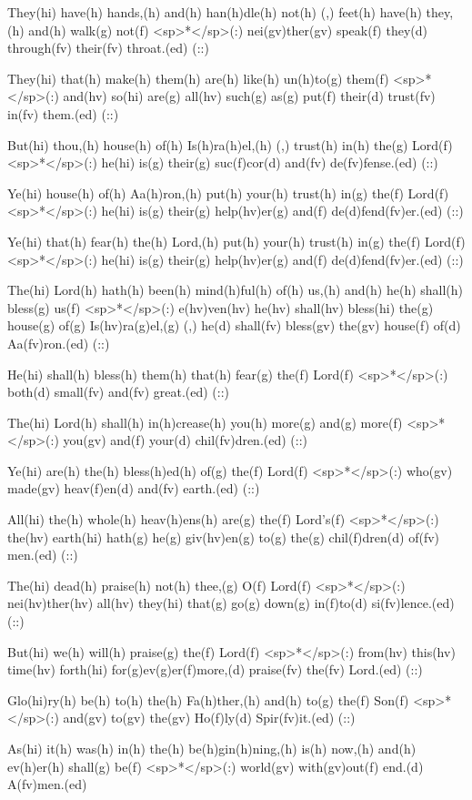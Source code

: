 They(hi) have(h) hands,(h) and(h) han(h)dle(h) not(h) (,) feet(h) have(h) they,(h) and(h) walk(g) not(f) <sp>*</sp>(:) nei(gv)ther(gv) speak(f) they(d) through(fv) their(fv) throat.(ed) (::)

They(hi) that(h) make(h) them(h) are(h) like(h) un(h)to(g) them(f) <sp>*</sp>(:) and(hv) so(hi) are(g) all(hv) such(g) as(g) put(f) their(d) trust(fv) in(fv) them.(ed) (::)

But(hi) thou,(h) house(h) of(h) Is(h)ra(h)el,(h) (,) trust(h) in(h) the(g) Lord(f) <sp>*</sp>(:) he(hi) is(g) their(g) suc(f)cor(d) and(fv) de(fv)fense.(ed) (::)

Ye(hi) house(h) of(h) Aa(h)ron,(h) put(h) your(h) trust(h) in(g) the(f) Lord(f) <sp>*</sp>(:) he(hi) is(g) their(g) help(hv)er(g) and(f) de(d)fend(fv)er.(ed) (::)

Ye(hi) that(h) fear(h) the(h) Lord,(h) put(h) your(h) trust(h) in(g) the(f) Lord(f) <sp>*</sp>(:) he(hi) is(g) their(g) help(hv)er(g) and(f) de(d)fend(fv)er.(ed) (::)

The(hi) Lord(h) hath(h) been(h) mind(h)ful(h) of(h) us,(h) and(h) he(h) shall(h) bless(g) us(f) <sp>*</sp>(:) e(hv)ven(hv) he(hv) shall(hv) bless(hi) the(g) house(g) of(g) Is(hv)ra(g)el,(g) (,) he(d) shall(fv) bless(gv) the(gv) house(f) of(d) Aa(fv)ron.(ed) (::)

He(hi) shall(h) bless(h) them(h) that(h) fear(g) the(f) Lord(f) <sp>*</sp>(:)  both(d) small(fv) and(fv) great.(ed) (::)

The(hi) Lord(h) shall(h) in(h)crease(h) you(h) more(g) and(g) more(f) <sp>*</sp>(:) you(gv) and(f) your(d) chil(fv)dren.(ed) (::)

Ye(hi) are(h) the(h) bless(h)ed(h) of(g) the(f) Lord(f) <sp>*</sp>(:) who(gv) made(gv) heav(f)en(d) and(fv) earth.(ed) (::)

All(hi) the(h) whole(h) heav(h)ens(h) are(g) the(f) Lord's(f) <sp>*</sp>(:) the(hv) earth(hi) hath(g) he(g) giv(hv)en(g) to(g) the(g) chil(f)dren(d) of(fv) men.(ed) (::)

The(hi) dead(h) praise(h) not(h) thee,(g) O(f) Lord(f) <sp>*</sp>(:) nei(hv)ther(hv) all(hv) they(hi) that(g) go(g) down(g) in(f)to(d) si(fv)lence.(ed) (::)

But(hi) we(h) will(h) praise(g) the(f) Lord(f) <sp>*</sp>(:) from(hv) this(hv) time(hv) forth(hi) for(g)ev(g)er(f)more,(d) praise(fv) the(fv) Lord.(ed) (::)

Glo(hi)ry(h) be(h) to(h) the(h) Fa(h)ther,(h) and(h) to(g) the(f) Son(f) <sp>*</sp>(:) and(gv) to(gv) the(gv) Ho(f)ly(d) Spir(fv)it.(ed) (::)

As(hi) it(h) was(h) in(h) the(h) be(h)gin(h)ning,(h) is(h) now,(h) and(h) ev(h)er(h) shall(g) be(f) <sp>*</sp>(:) world(gv) with(gv)out(f) end.(d) A(fv)men.(ed)
